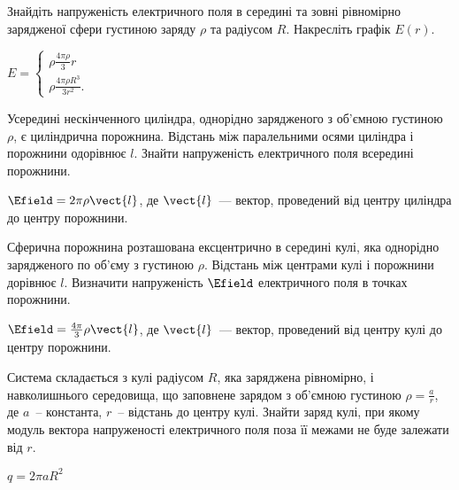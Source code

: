 \begin{problem}
    Знайдіть напруженість електричного поля в середині та зовні рівномірно зарядженої сфери густиною заряду $\rho$ та радіусом $R$. Накресліть графік $E(r)$.
\begin{solution}
	$E =
		\begin{cases}
			\rho\frac{4\pi\rho}{3}r\\
			\rho\frac{4\pi\rho R^3}{3 r^2}.
		\end{cases}
	$
\end{solution}
\end{problem}

\begin{problem}
    Усередині нескінченного циліндра, однорідно зарядженого з об'ємною густиною $\rho$, є циліндрична порожнина. Відстань між паралельними осями циліндра і порожнини одорівнює $l$. Знайти напруженість електричного поля всередині порожнини.
\begin{solution}
	$\Efield = 2\pi\rho \vect{l}$, де $\vect{l}$~--- вектор, проведений від центру циліндра до центру порожнини.
\end{solution}
\end{problem}


\begin{problem}
Сферична порожнина розташована ексцентрично в середині кулі, яка однорідно зарядженого по об'єму з густиною
$\rho$. Відстань між центрами кулі і порожнини дорівнює $l$. Визначити напруженість $\Efield$ електричного поля в точках порожнини.
\begin{solution}
	$\Efield = \frac{4\pi}{3}\rho \vect{l}$, де $\vect{l}$~--- вектор, проведений від центру кулі до центру порожнини.
\end{solution}
\end{problem}

\begin{problem}
Система складається з кулі радіусом $R$, яка заряджена рівномірно, і навколишнього середовища, що заповнене зарядом з об'ємною густиною $\rho = \frac{a}{r}$, де $a$~-- константа, $r$~-- відстань до центру кулі. Знайти заряд кулі, при якому модуль вектора напруженості електричного поля поза її межами не буде залежати від $r$.
\begin{solution}
	$q = 2\pi a R^2$
\end{solution}
\end{problem}

